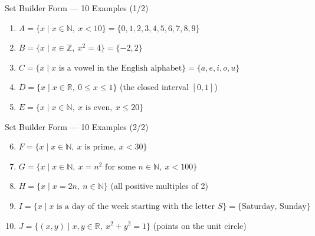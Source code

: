 \documentclass[10pt]{beamer}
\begin{document}
\begin{frame}{Set Builder Form --- 10 Examples (1/2)}
  \small
  \begin{enumerate}
    \item $A = \{ x \mid x \in \mathbb{N},\ x < 10 \} = \{0,1,2,3,4,5,6,7,8,9\}$
    \item $B = \{ x \mid x \in \mathbb{Z},\ x^2 = 4 \} = \{-2, 2\}$
    \item $C = \{ x \mid x \text{ is a vowel in the English alphabet} \} = \{a,e,i,o,u\}$
    \item $D = \{ x \mid x \in \mathbb{R},\ 0 \le x \le 1 \}$ \quad (the closed interval $[0,1]$)
    \item $E = \{ x \mid x \in \mathbb{N},\ x \text{ is even},\ x \le 20 \}$
  \end{enumerate}
\end{frame}

\begin{frame}{Set Builder Form --- 10 Examples (2/2)}
  \small
  \begin{enumerate}
    \setcounter{enumi}{5}
    \item $F = \{ x \mid x \in \mathbb{N},\ x \text{ is prime},\ x < 30 \}$
    \item $G = \{ x \mid x \in \mathbb{N},\ x = n^2 \text{ for some } n \in \mathbb{N},\ x < 100 \}$
    \item $H = \{ x \mid x = 2n,\ n \in \mathbb{N} \}$ \quad (all positive multiples of 2)
    \item $I = \{ x \mid x \text{ is a day of the week starting with the letter } S \} = \{\text{Saturday, Sunday}\}$
    \item $J = \{ (x,y) \mid x, y \in \mathbb{R},\ x^2 + y^2 = 1 \}$ \quad (points on the unit circle)
  \end{enumerate}
\end{frame}

\end{document}
